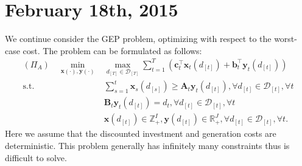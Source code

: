 \documentclass[10pt]{article}
\theoremstyle{plain}
\theoremstyle{definition}
\theoremstyle{remark}
\newcommand{\mb}{\mathbf}
\newcommand{\mcal}{\mathcal}
\newcommand{\tr}{^{\top}}
\newcommand{\subjectto}{\text{s.t.}}
\newcommand{\bA}{\mathbf{A}}
\newcommand{\bB}{\mathbf{B}}
\newcommand{\bb}{\mathbf{b}}
\newcommand{\bx}{\mathbf{x}}
\newcommand{\by}{\mathbf{y}}
\newcommand{\Z}{\mathbb{Z}}
\newcommand{\R}{\mathbb{R}}
\begin{document}
\newpage
\section*{February 18th, 2015}
We continue consider the GEP problem, optimizing with respect to the worst-case cost.
The problem can be formulated as follows:
\begin{align*}
(\Pi_A) \quad \min_{\bx(\cdot), \by(\cdot)}
& \max_{d_{[T]}\in \mcal{D}_{[T]}} \sum_{t=1}^{T}(\mb{c}_t\tr \bx_t(d_{[t]}) + \bb_t\tr \by_t(d_{[t]}))\\
\subjectto\quad
& \sum_{s=1}^t\bx_s(d_{[s]}) \ge \bA_t\by_t(d_{[t]}), \forall d_{[t]}\in \mcal{D}_{[t]}, \forall t\\
& \bB_t\by_t(d_{[t]}) = d_t, \forall d_{[t]}\in \mcal{D}_{[t]}, \forall t\\
& \bx(d_{[t]})\in \Z^I_+, \by(d_{[t]})\in \R^J_+, \forall d_{[t]}\in \mcal{D}_{[t]}, \forall t.
\end{align*}
Here we assume that the discounted investment and generation costs are deterministic.
This problem generally has infinitely many constraints thus is difficult to solve.
\end{document}
